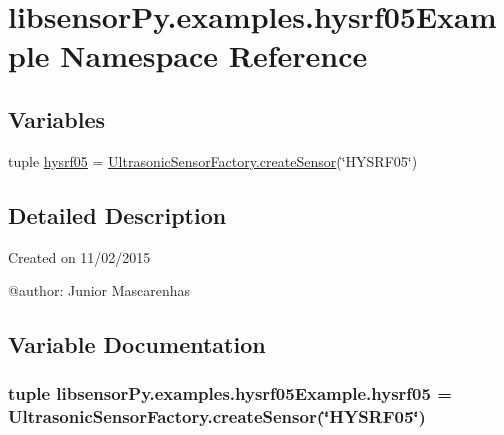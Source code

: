 \hypertarget{namespacelibsensorPy_1_1examples_1_1hysrf05Example}{}\section{libsensor\+Py.\+examples.\+hysrf05\+Example Namespace Reference}
\label{namespacelibsensorPy_1_1examples_1_1hysrf05Example}
\subsection*{Variables}
\begin{DoxyCompactItemize}
\item 
tuple \hyperlink{namespacelibsensorPy_1_1examples_1_1hysrf05Example_abeab03bf7129c6966cfda96450b9a955}{hysrf05} = \hyperlink{classconcretefactory_1_1ultrasonicSensorFactory_1_1UltrasonicSensorFactory_ade21ba1ce348eb9e5cf8eee3fda4a773}{Ultrasonic\+Sensor\+Factory.\+create\+Sensor}(\char`\"{}H\+Y\+S\+R\+F05\char`\"{})
\end{DoxyCompactItemize}


\subsection{Detailed Description}
\begin{DoxyVerb}Created on 11/02/2015

@author: Junior Mascarenhas
\end{DoxyVerb}
 

\subsection{Variable Documentation}
\hypertarget{namespacelibsensorPy_1_1examples_1_1hysrf05Example_abeab03bf7129c6966cfda96450b9a955}{}
\subsubsection[{hysrf05}]{\setlength{\rightskip}{0pt plus 5cm}tuple libsensor\+Py.\+examples.\+hysrf05\+Example.\+hysrf05 = {\bf Ultrasonic\+Sensor\+Factory.\+create\+Sensor}(\char`\"{}H\+Y\+S\+R\+F05\char`\"{})}\label{namespacelibsensorPy_1_1examples_1_1hysrf05Example_abeab03bf7129c6966cfda96450b9a955}

